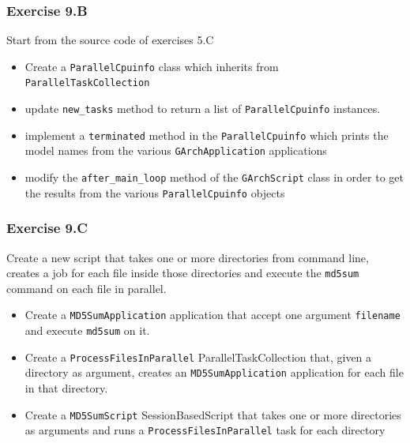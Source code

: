 \documentclass[english,serif,mathserif,xcolor=pdftex,dvipsnames,table]{beamer}
\begin{document}
\begin{frame}
  \frametitle{Exercise 9.B}

  Start from the source code of exercises 5.C

  \begin{itemize}
  \item Create a \lstinline|ParallelCpuinfo| class which
    inherits from \lstinline|ParallelTaskCollection|
  \item update \lstinline|new_tasks| method to return a list of
    \lstinline|ParallelCpuinfo| instances.
  \item implement a \lstinline|terminated| method in the
    \lstinline|ParallelCpuinfo| which prints the model names from the
    various \lstinline|GArchApplication| applications
  \item modify the \lstinline|after_main_loop| method of the
    \lstinline|GArchScript| class in order to get the results from the
    various \lstinline|ParallelCpuinfo| objects
  \end{itemize}
\end{frame}

\begin{frame}
  \frametitle{Exercise 9.C}

  Create a new script that takes one or more directories from command
  line, creates a job for each file inside those directories and
  execute the \lstinline|md5sum| command on each file in parallel.

  \begin{itemize}
  \item Create a \lstinline|MD5SumApplication| application that accept
    one argument \lstinline|filename| and execute \lstinline|md5sum|
    on it.
  \item Create a \lstinline|ProcessFilesInParallel|
    ParallelTaskCollection that, given a directory as argument,
    creates an \lstinline|MD5SumApplication| application for each file
    in that directory.
  \item Create a \lstinline|MD5SumScript| SessionBasedScript that
    takes one or more directories as arguments and runs a
    \lstinline|ProcessFilesInParallel| task for each directory
  \end{itemize}
\end{frame}
\end{document}
